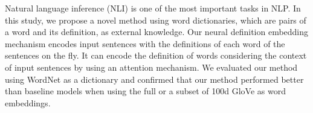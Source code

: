 Natural language inference (NLI) is one of the most important tasks in NLP. In this study, we propose a novel method using word dictionaries, which are pairs of a word and its definition, as external knowledge. Our neural definition embedding mechanism encodes input sentences with the definitions of each word of the sentences on the fly. It can encode the definition of words considering the context of input sentences by using an attention mechanism. We evaluated our method using WordNet as a dictionary and confirmed that our method performed better than baseline models when using the full or a subset of 100d GloVe as word embeddings.
